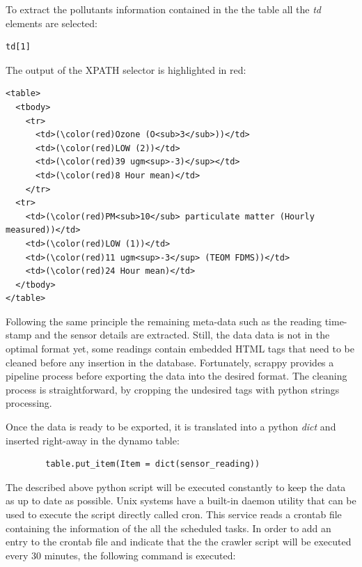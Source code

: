 To extract the pollutants information contained in the the table all the \textit{td} elements are selected: 

{\centering
\begin{BVerbatim}
td[1]
\end{BVerbatim}
\par
}\bigskip

The output of the XPATH selector is highlighted in red: 

\begin{Verbatim}[fontsize=\small,commandchars=\\\(\)]
<table>
  <tbody>
    <tr>
      <td>(\color(red)Ozone (O<sub>3</sub>))</td>
      <td>(\color(red)LOW (2))</td>
      <td>(\color(red)39 ugm<sup>-3)</sup></td>
      <td>(\color(red)8 Hour mean)</td>
    </tr>
  <tr>
    <td>(\color(red)PM<sub>10</sub> particulate matter (Hourly measured))</td>
    <td>(\color(red)LOW (1))</td>
    <td>(\color(red)11 ugm<sup>-3</sup> (TEOM FDMS))</td>
    <td>(\color(red)24 Hour mean)</td>
  </tbody>
</table>                
\end{Verbatim}

Following the same principle the remaining meta-data such as the reading time-stamp and the sensor details are extracted. Still, the data data is not in the optimal format yet, some readings contain embedded HTML tags that need to be cleaned before any insertion in the database. Fortunately, scrappy provides a pipeline process before exporting the data into the desired format. The cleaning process is straightforward, by cropping the undesired tags with python strings processing. 

Once the data is ready to be exported, it is translated into a python \textit{dict} and inserted right-away in the dynamo table: \bigskip

{\centering
\begin{BVerbatim}
        table.put_item(Item = dict(sensor_reading))
\end{BVerbatim}
\par
}\bigskip


The described above python script will be executed constantly to keep the data as up to date as possible. Unix systems have a built-in daemon utility that can be used to execute the script directly called cron. This service reads a crontab file containing the information of the all the scheduled tasks. In order to add an entry to the crontab file and indicate that the the crawler script will be executed every 30 minutes, the following command is executed: \bigskip


